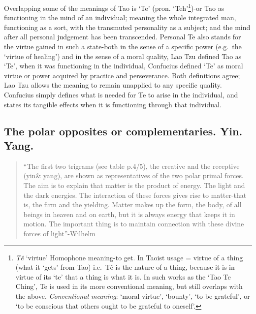 \documentclass[11pt]{book}
\begin{document}
Overlapping some of the meanings of Tao is `Te' (pron. `Teh'\footnote{\emph{Tê} `virtue' Homophone meaning-to get. In Taoist usage = virtue of a thing (what it `gets' from Tao) i.e.~Tê is the nature of a thing, because it is in virtue of its `te' that a thing is what it is. In such works as the `Tao Te Ching', Te is used in its more conventional meaning, but still overlaps with the above. \emph{Conventional meaning}: `moral virtue', `bounty', `to be grateful', or `to be conscious that others ought to be grateful to oneself'.})-or Tao as functioning in the mind of an individual; meaning the whole integrated man, functioning as a sort, with the transmuted personality as a subject; and the mind after all personal judgement has been transcended. Personal Te also stands for the virtue gained in such a state-both in the sense of a specific power (e.g.~the `virtue of healing') and in the sense of a moral quality, Lao Tzu defined Tao as `Te', when it was functioning in the individual, Confucius defined `Te' as moral virtue or power acquired by practice and perseverance. Both definitions agree; Lao Tzu allows the meaning to remain unapplied to any specific quality. Confucius simply defines what is needed for Te to arise in the individual, and states its tangible effects when it is functioning through that individual.

\hypertarget{the-polar-opposites-or-complementaries.-yin.-yang.}{%
\subsection{The polar opposites or complementaries. Yin. Yang.}\label{the-polar-opposites-or-complementaries.-yin.-yang.}}

\begin{quote}
``The first two trigrams (see table p.4/5), the creative and the receptive (yin\& yang), are shown as representatives of the two polar primal forces. The aim is to explain that matter is the product of energy. The light and the dark energies. The interaction of these forces gives rise to matter-that is, the firm and the yielding. Matter makes up the form, the body, of all beings in heaven and on earth, but it is always energy that keeps it in motion. The important thing is to maintain connection with these divine forces of light''-Wilhelm
\end{quote}
\end{document}
